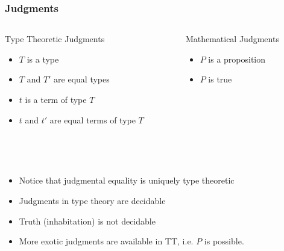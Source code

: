 \documentclass[10pt]{beamer}
\begin{document}
\begin{frame}

\frametitle{Judgments}

\begin{columns}

\begin{column}{0.4 \textwidth}
\begin{block}{Type Theoretic Judgments}
  \begin{itemize}
  \item $T$ is a type
  \item $T$ and $T'$ are equal types
  \item $t$ is a term of type $T$
  \item $t$ and $t'$ are equal terms of type $T$
  \end{itemize}
\end{block}
\end{column}

\begin{column}{0.4 \textwidth}
\begin{block}{Mathematical Judgments}
  \begin{itemize}
  \item $P$ is a proposition
  \item $P$ is true
  \end{itemize}
\end{block}
\end{column}
\end{columns}

\\~\\
\begin{itemize}
  \item Notice that judgmental equality is uniquely type theoretic
  \item Judgments in type theory are decidable
  \item Truth (inhabitation) is not decidable
  \item More exotic judgments are available in TT, i.e. $P$ is possible.
\end{itemize}

\end{frame}
\end{document}
